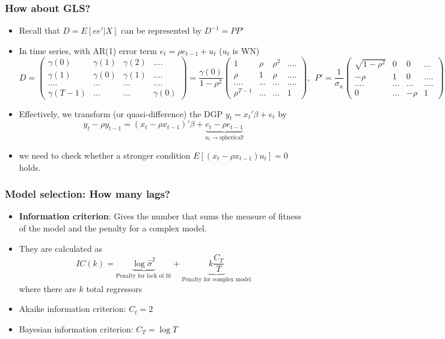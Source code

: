 \documentclass[aspectratio=169]{beamer}
\begin{document}
\begin{frame}
\frametitle{How about GLS?}
\begin{itemize}
\item Recall that $D=E[ee'|X]$ can be represented by $D^{-1}=PP'$
\item In time series, with AR(1) error term $e_t = \rho e_{t-1}+u_t$ ($u_t$  is WN)
\scriptsize{\[
D=\begin{pmatrix}\gamma(0)  & \gamma(1) & \gamma(2) & ....\\ \gamma(1) & \gamma(0) & \gamma(1) & ....\\.... & ... & ... & ....\\ \gamma(T-1) & ... & ... & \gamma(0) \end{pmatrix}=\frac{\gamma(0)}{1-\rho^2}\begin{pmatrix} 1 & \rho & \rho^2 & ....\\ \rho & 1 & \rho & ....\\.... & ... & ... & ....\\ \rho^{T-1} & ... & ... & 1\end{pmatrix}, \ \  P'=\frac{1}{\sigma_u}\begin{pmatrix} \sqrt{1-\rho^2} & 0 & 0 & ...\\ -\rho & 1 & 0 & ....\\.... & ... & ... & ....\\0 & ... & -\rho & 1\end{pmatrix}
\]}\normalsize
\item  Effectively, we transform (or quasi-difference) the DGP $y_t = x_t'\beta+e_t$ by
\[
y_{t}-\rho y_{t-1} = (x_t-\rho x_{t-1})'\beta + \underbrace{e_t-\rho e_{t-1}}_{u_t\to\text{spherical!}}
\]
\item we need to check whether a stronger condition $E[(x_t-\rho x_{t-1})u_t]=0$ holds.
\end{itemize}
\end{frame}

\begin{frame}
\frametitle{Model selection: How many lags?}
\begin{itemize}
\item \textbf{Information criterion}: Gives the number that sums the measure of fitness of the model and the penalty for a complex model. 
\item They are calculated as
\[
IC(k) = \underbrace{\log\hat{\sigma}^2}_{\text{Penalty for lack of fit}}+\underbrace{k\frac{C_T}{T}}_{\text{Penalty for complex model}}
\]
where there are $k$ total regressors
\item Akaike information criterion: $C_t= 2$
\item Bayesian information criterion: $C_T=\log{T}$
\end{itemize}
\end{frame}
\end{document}
